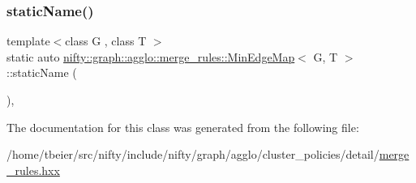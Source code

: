 \subsubsection{\texorpdfstring{static\+Name()}{staticName()}}
{\footnotesize\ttfamily template$<$class G , class T $>$ \\
static auto \hyperlink{classnifty_1_1graph_1_1agglo_1_1merge__rules_1_1MinEdgeMap}{nifty\+::graph\+::agglo\+::merge\+\_\+rules\+::\+Min\+Edge\+Map}$<$ G, T $>$\+::static\+Name (\begin{DoxyParamCaption}{ }\end{DoxyParamCaption})\hspace{0.3cm}{\ttfamily [inline]}, {\ttfamily [static]}}



The documentation for this class was generated from the following file\+:\begin{DoxyCompactItemize}
\item 
/home/tbeier/src/nifty/include/nifty/graph/agglo/cluster\+\_\+policies/detail/\hyperlink{merge__rules_8hxx}{merge\+\_\+rules.\+hxx}\end{DoxyCompactItemize}
